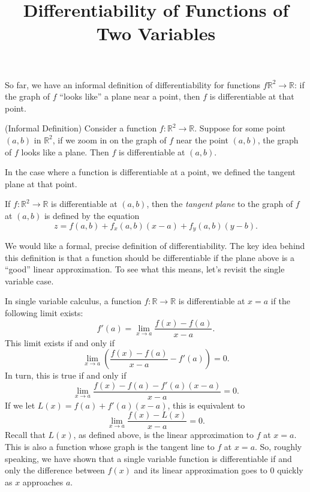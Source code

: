 \documentclass{ximera}
\title{Differentiability of Functions of Two Variables}
\begin{document}
\begin{abstract}
\end{abstract}
\maketitle

So far, we have an informal definition of differentiability for functions $f\mathbb{R}^2\rightarrow \mathbb{R}$: if the graph of $f$ ``looks like'' a plane near a point, then $f$ is differentiable at that point.

\begin{definition}
(Informal Definition) Consider a function $f:\mathbb{R}^2\rightarrow \mathbb{R}$. Suppose for some point $(a,b)$ in $\mathbb{R}^2$, if we zoom in on the graph of $f$ near the point $(a,b)$, the graph of $f$ looks like a plane. Then $f$ is differentiable at $(a,b)$.
\end{definition}

In the case where a function is differentiable at a point, we defined the tangent plane at that point.

\begin{definition}
If $f:\mathbb{R}^2\rightarrow\mathbb{R}$ is differentiable at $(a,b)$, then the \emph{tangent plane} to the graph of $f$ at $(a,b)$ is defined by the equation
\[
z=f(a,b)+f_x(a,b)(x-a)+f_y(a,b)(y-b).
\]
\end{definition}

We would like a formal, precise definition of differentiability. The key idea behind this definition is that a function should be differentiable if the plane above is a ``good'' linear approximation. To see what this means, let's revisit the single variable case.

In single variable calculus, a function $f:\mathbb{R}\rightarrow\mathbb{R}$ is differentiable at $x=a$ if the following limit exists:
\[
f'(a) = \lim_{x\rightarrow a}\frac{f(x)-f(a)}{x-a}.
\]
This limit exists if and only if
\[
\lim_{x\rightarrow a}\left(\frac{f(x)-f(a)}{x-a} - f'(a)\right) = 0.
\]
In turn, this is true if and only if
\[
\lim_{x\rightarrow a}\frac{f(x)-f(a)-f'(a)(x-a)}{x-a} = 0.
\]
If we let $L(x) = f(a) + f'(a)(x-a)$, this is equivalent to
\[
\lim_{x\rightarrow a}\frac{f(x)-L(x)}{x-a} = 0.
\]
Recall that $L(x)$, as defined above, is the linear approximation to $f$ at $x=a$. This is also a function whose graph is the tangent line to $f$ at $x=a$. So, roughly speaking, we have shown that a single variable function is differentiable if and only the difference between $f(x)$ and its linear approximation goes to $0$ quickly as $x$ approaches $a$.
\end{document}
